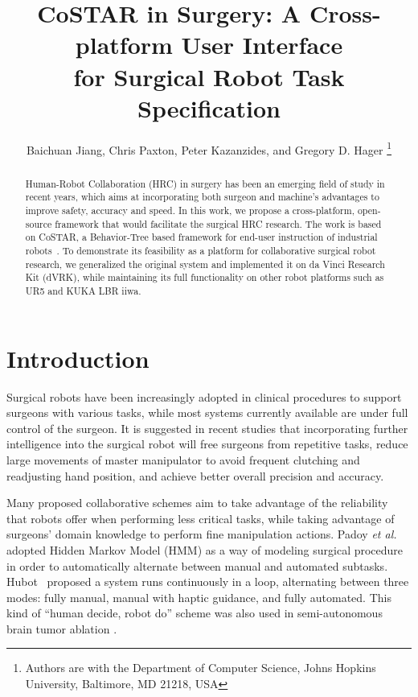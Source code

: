 \documentclass[letterpaper, 10 pt, conference]{ieeeconf}
\title{\huge \bf
CoSTAR in Surgery: A Cross-platform User Interface \\for Surgical Robot Task Specification
}
\author{Baichuan Jiang, Chris Paxton, Peter Kazanzides, and Gregory D. Hager
\thanks{Authors are with the Department of Computer Science, Johns Hopkins University,
        Baltimore, MD 21218, USA}
}
\begin{document}
\maketitle
\thispagestyle{empty}
\pagestyle{empty}


\newcommand{\fix}[1]{{\color{red} \textbf{[FIX: #1]}}}
\newcommand{\todo}[2]{{\color{blue} \textbf{[TODO(#1): #2]}}}

\begin{abstract}

Human-Robot Collaboration (HRC) in surgery has been an emerging field of study in recent years, which aims at incorporating both surgeon and machine's advantages to improve safety, accuracy and speed. In this work, we propose a cross-platform, open-source framework that would facilitate the surgical HRC research. The work is based on CoSTAR, a Behavior-Tree based framework for end-user instruction of industrial robots~\cite{paxton2017costar}. To demonstrate its feasibility as a platform for collaborative surgical robot research, we generalized the original system and implemented it on da Vinci Research Kit (dVRK), while maintaining its full functionality on other robot platforms such as UR5 and KUKA LBR iiwa.  

\end{abstract}


\section{Introduction}

Surgical robots have been increasingly adopted in clinical procedures to support surgeons with various tasks, while most systems currently available are under full control of the surgeon. It is suggested in recent studies \cite{padoy2011human,berthet2016hubot,bauzano2016collaborative,hu2015semi} that incorporating further intelligence into the surgical robot will free surgeons from repetitive tasks, reduce large movements of master manipulator to avoid frequent clutching and readjusting hand position, and achieve better overall precision and accuracy. 

Many proposed collaborative schemes aim to take advantage of the reliability that robots offer when performing less critical tasks, while taking advantage of surgeons' domain knowledge to perform fine manipulation actions. Padoy \textit{et al.}~\cite{padoy2011human} adopted Hidden Markov Model (HMM) as a way of modeling surgical procedure in order to automatically alternate between manual and automated subtasks. Hubot~\cite{berthet2016hubot} proposed a system runs continuously in a loop, alternating between three modes: fully manual, manual with haptic guidance, and fully automated. This kind of ``human decide, robot do'' scheme was also used in semi-autonomous brain tumor ablation \cite{hu2015semi}.
\end{document}
